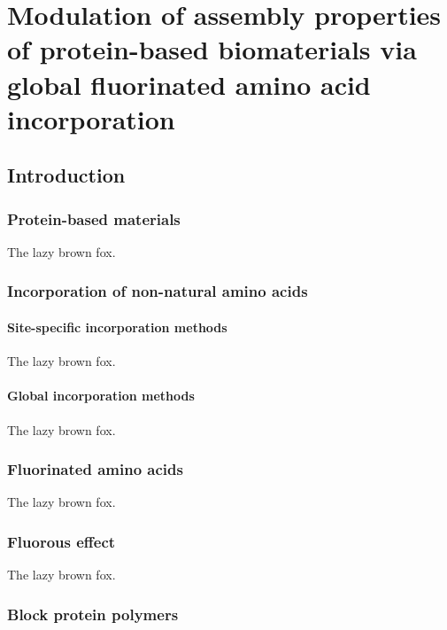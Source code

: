 
\chapter{Modulation of assembly properties of protein-based biomaterials via
global fluorinated amino acid incorporation} 
\label{chap:sample}
\begin{refsection}

\section{Introduction}

\subsection{Protein-based materials}
The lazy brown fox.

\subsection{Incorporation of non-natural amino acids}
\subsubsection{Site-specific incorporation methods}
The lazy brown fox.
\subsubsection{Global incorporation methods}
The lazy brown fox.

\subsection{Fluorinated amino acids}
The lazy brown fox.

\subsection{Fluorous effect}
The lazy brown fox.

\subsection{Block protein polymers}

\end{refsection}
